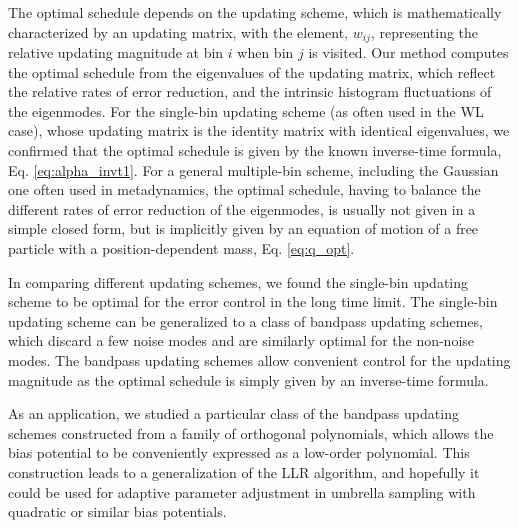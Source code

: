 \documentclass[reprint, superscriptaddress, floatfix]{revtex4-1}
\begin{document}
The optimal schedule depends on the updating scheme,
which is mathematically characterized by an updating matrix,
with the element, $w_{ij}$,
representing the relative updating magnitude
at bin $i$ when bin $j$ is visited.
%
Our method computes the optimal schedule from
the eigenvalues of the updating matrix,
which reflect the relative rates of error reduction,
and the intrinsic histogram fluctuations
of the eigenmodes.
%
For the single-bin updating scheme (as often used in the WL case),
whose updating matrix is the identity matrix with identical eigenvalues,
we confirmed that the optimal schedule
is given by the known inverse-time formula,
Eq. \eqref{eq:alpha_invt1}.
%
For a general multiple-bin scheme,
including the Gaussian one often used in metadynamics,
the optimal schedule, having to balance
the different rates of error reduction of the eigenmodes,
is usually not given in a simple closed form,
but is implicitly given by an equation of motion
of a free particle with a position-dependent mass,
Eq. \eqref{eq:q_opt}.
%



In comparing different updating schemes,
we found
the single-bin updating scheme to be optimal
for the error control in the long time limit.
%
The single-bin updating scheme can be generalized to
a class of bandpass updating schemes,
which discard a few noise modes
and are similarly optimal for the non-noise modes.
%
The bandpass updating schemes allow convenient control
for the updating magnitude
as the optimal schedule
is simply given by an inverse-time formula.

As an application,
we studied a particular class
of the bandpass updating schemes
constructed from a family of orthogonal polynomials,
which allows the bias potential
to be conveniently expressed as a low-order polynomial.
%
This construction leads to a generalization
of the LLR algorithm\cite{langfeld2012, pellegrini2014},
and hopefully it could be used for
adaptive parameter adjustment
in umbrella sampling with
quadratic\cite{neuhaus2006, *neuhaus2007, zhu2012}
or similar\cite{martin-mayor2007, *sergio2011, *persson2013, kim2010}
bias potentials.
\end{document}
